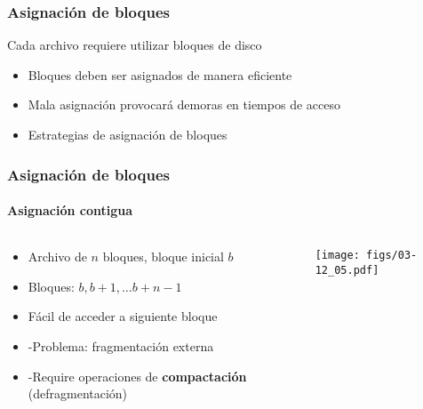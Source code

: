 \documentclass[letter]{beamer}
\begin{document}
\begin{frame}
  \frametitle{Asignación de bloques}

  Cada archivo requiere utilizar bloques de disco
  
  \begin{itemize}
    \item Bloques deben ser asignados de manera eficiente
    \item Mala asignación provocará demoras en tiempos de acceso
    \item Estrategias de asignación de bloques
  \end{itemize}

\end{frame}
\begin{frame}
  \frametitle{Asignación de bloques}
  \framesubtitle{Asignación contigua}
  
  \begin{columns}[c]
    \begin{column}[T]{6cm}
      \begin{itemize}
        \item Archivo de $n$ bloques, bloque inicial $b$
        \item Bloques: $b, b+1, \ldots b+n-1$
        \item Fácil de acceder a siguiente bloque
        \item <2-> -Problema: fragmentación externa
        \item <3-> -Require operaciones de {\bf compactación}
              (defragmentación)
      \end{itemize}
    \end{column}
    \begin{column}[T]{5cm}
      \begin{center}
        \texttt{[image: figs/03-12\_05.pdf]}
      \end{center}
    \end{column}
  \end{columns}  
\end{frame}
\end{document}

